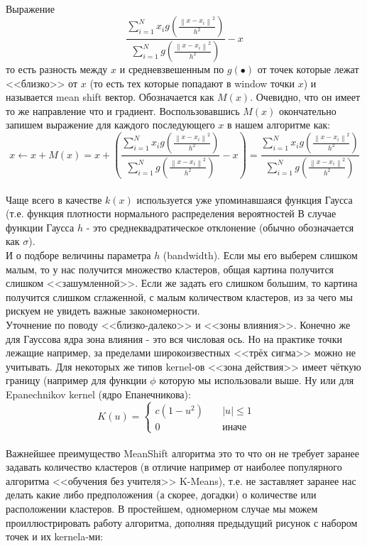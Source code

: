 \documentclass[11pt]{article}
\begin{document}
\\ Выражение \[
\boxed{\frac{\sum\limits_{i = 1}^{N}x_i g\left(\frac{\left\|x - x_i\right\|^2}{h^2}\right)}{\sum\limits_{i = 1}^{N}g\left(\frac{\left\|x - x_i\right\|^2}{h^2}\right)} - x}
\] то есть разность между $x$ и средневзвешенным по $g(\bullet)$ от
точек которые лежат <<близко>> от $x$ (то есть тех которые попадают
в window точки $x$) и называется mean shift вектор. Обозначается как
$M(x)$. Очевидно, что он имеет то же направление что и градиент.
Воспользовавшись $M(x)$ окончательно запишем выражение для каждого
последующего $x$ в нашем алгоритме как: \[
x \gets x + M(x) = x + \left(\frac{\sum\limits_{i = 1}^{N}x_i g\left(\frac{\left\|x - x_i\right\|^2}{h^2}\right)}{\sum\limits_{i = 1}^{N}g\left(\frac{\left\|x - x_i\right\|^2}{h^2}\right)} - x \right) = \frac{\sum\limits_{i = 1}^{N}x_i g\left(\frac{\left\|x - x_i\right\|^2}{h^2}\right)}{\sum\limits_{i = 1}^{N}g\left(\frac{\left\|x - x_i\right\|^2}{h^2}\right)}
\] \\ Чаще всего в качестве $k(x)$ используется уже
упоминавшаяся функция Гаусса (т.е. функция плотности нормального
распределения вероятностей В случае функции Гаусса $h$ - это
среднеквадратическое отклонение (обычно обозначается как $\sigma$).
\\ И о подборе величины параметра $h$ (bandwidth). Если мы
его выберем слишком малым, то у нас получится множество кластеров, общая
картина получится слишком <<зашумленной>>. Если же задать его
слишком большим, то картина получится слишком сглаженной, с малым
количеством кластеров, из за чего мы рискуем не увидеть важные
закономерности. \\ Уточнение по поводу
<<близко-далеко>> и <<зоны влияния>>. Конечно же для Гауссова
ядра зона влияния - это вся числовая ось. Но на практике точки лежащие
например, за пределами широкоизвестных <<трёх сигма>> можно не
учитывать. Для некоторых же типов kernel-ов <<зона действия>> имеет
чёткую границу (например для функции $\phi$ которую мы использовали
выше. Ну или для Epanechnikov kernel (ядро Епанечникова): \[
K\left( u \right) = \left\lbrace
            \begin{aligned}
            c\left( 1 - u^2 \right) && \; |u| \le 1 && \\
            0 && \; \mbox{иначе} &&
           \end{aligned}
          \right.
\] \\ Важнейшее преимущество MeanShift алгоритма это то что
он не требует заранее задавать количество кластеров (в отличие например
от наиболее популярного алгоритма <<обучения без учителя>>
K-Means), т.е. не заставляет заранее нас делать какие либо предположения
(а скорее, догадки) о количестве или расположении кластеров. В
простейшем, одномерном случае мы можем проиллюстрировать работу
алгоритма, дополняя предыдущий рисунок с набором точек и их kernela-ми:
\end{document}
